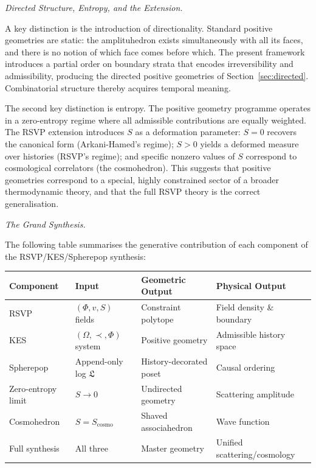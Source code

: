 \documentclass[11pt]{article}
\theoremstyle{plain}
\theoremstyle{definition}
\theoremstyle{remark}
\newcommand{\Phif}{\Phi}
\newcommand{\vf}{v}
\newcommand{\Sf}{S}
\newcommand{\OmKS}{\Omega}
\newcommand{\Log}{\mathfrak{L}}
\begin{document}
\medskip\noindent\textit{Directed Structure, Entropy, and the Extension.}

A key distinction is the introduction of directionality. Standard positive geometries are static: the amplituhedron exists simultaneously with all its faces, and there is no notion of which face comes before which. The present framework introduces a partial order on boundary strata that encodes irreversibility and admissibility, producing the directed positive geometries of Section~\ref{sec:directed}. Combinatorial structure thereby acquires temporal meaning.

The second key distinction is entropy. The positive geometry programme operates in a zero-entropy regime where all admissible contributions are equally weighted. The RSVP extension introduces $\Sf$ as a deformation parameter: $\Sf = 0$ recovers the canonical form (Arkani-Hamed's regime); $\Sf > 0$ yields a deformed measure over histories (RSVP's regime); and specific nonzero values of $\Sf$ correspond to cosmological correlators (the cosmohedron). This suggests that positive geometries correspond to a special, highly constrained sector of a broader thermodynamic theory, and that the full RSVP theory is the correct generalisation.

\medskip\noindent\textit{The Grand Synthesis.}

The following table summarises the generative contribution of each component of the RSVP/KES/Spherepop synthesis:

\begin{center}
\begin{tabular}{llll}
\toprule
Component & Input & Geometric Output & Physical Output \\
\midrule
RSVP & $(\Phif, \vf, \Sf)$ fields & Constraint polytope & Field density \& boundary \\
KES & $(\OmKS, \prec, \Phif)$ system & Positive geometry & Admissible history space \\
Spherepop & Append-only log $\Log$ & History-decorated poset & Causal ordering \\
Zero-entropy limit & $\Sf \to 0$ & Undirected geometry & Scattering amplitude \\
Cosmohedron & $\Sf = \Sf_{\mathrm{cosmo}}$ & Shaved associahedron & Wave function \\
Full synthesis & All three & Master geometry & Unified scattering/cosmology \\
\bottomrule
\end{tabular}
\end{center}
\end{document}
